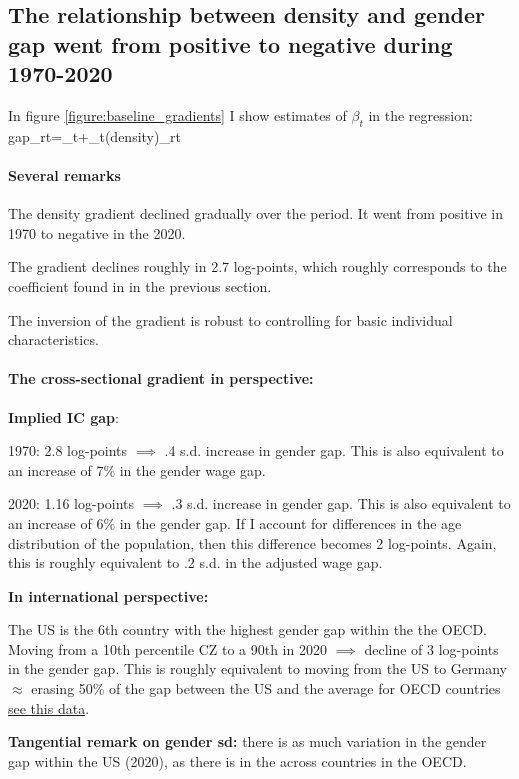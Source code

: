 



\subsection{The relationship between density and gender gap went from positive to negative during 1970-2020}

In figure \ref{figure:baseline_gradients} I show estimates of $\beta_t$ in the regression:
\beqns
	gap_{rt}=\alpha_t+\beta_t\ln(density)_{rt}
\eeqns

\paragraph{Several remarks}
\bitem
	\item The density gradient declined gradually over the period. It went from positive in 1970 to negative in the 2020.
	\item The gradient declines roughly in 2.7 log-points, which roughly corresponds to the coefficient found in in the previous section.
	\item The inversion of the gradient is robust to controlling for basic individual characteristics.
\eitem 


\paragraph{The cross-sectional gradient in perspective:}
\bitem 
\item \textbf{Implied IC gap}:
\bitem
	\item 1970: 2.8 log-points $\implies$ .4 s.d. increase in gender gap. This is also equivalent to an increase of 7\% in the gender wage gap. 
	\item 2020: 1.16 log-points $\implies$ .3 s.d. increase in gender gap. This is also equivalent to an increase of 6\% in the gender gap. If I account for differences in the age distribution of the population, then this difference becomes 2 log-points. Again, this is roughly equivalent to .2 s.d. in the adjusted wage gap.
\eitem
	\item \textbf{In international perspective:} 
	\bitem 
	\item The US is the 6th country with the highest gender gap within the the OECD. Moving from a 10th percentile CZ to a 90th in 2020 $\implies$ decline of 3 log-points in the gender gap. This is roughly equivalent to moving from the US to Germany $\approx$ erasing 50\% of the gap between the US and the average for OECD countries \href{https://data.oecd.org/earnwage/gender-wage-gap.htm}{see this data}.
	\item \textbf{Tangential remark on gender sd:} there is as much variation in the gender gap within the US (2020), as there is in the across countries in the OECD.

